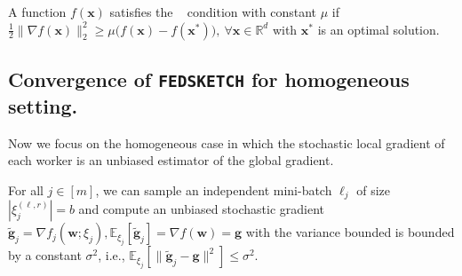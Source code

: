 \begin{assumption}[\pl]\label{assum:pl}
A function $f(\boldsymbol{x})$ satisfies the \pl~ condition with constant $\mu$ if $\frac{1}{2}\|\nabla f(\boldsymbol{x})\|_2^2\geq \mu\big(f(\boldsymbol{x})-f(\boldsymbol{x}^*)\big),\: \forall \boldsymbol{x}\in\mathbb{R}^d $ with $\boldsymbol{x}^*$ is an optimal solution.
\end{assumption}


\subsection{Convergence of  \texttt{FEDSKETCH} for homogeneous setting.} 
Now we focus on the homogeneous case in which the stochastic local gradient of each worker is an unbiased estimator of the global gradient.


\begin{assumption}\label{Assu:1.5}
For all $j\in [m]$, we can sample an independent mini-batch $\ell_j$   of size $|\xi_j^{(\ell,r)}| = b$ and compute an unbiased stochastic gradient  $\tilde{\mathbf{g}}_j = \nabla f_j(\boldsymbol{w}; \xi_j), \mathbb{E}_{\xi_j}[\tilde{\mathbf{g}}_j] = \nabla f(\boldsymbol{w})=\mathbf{g}$ with  the variance bounded is bounded by a constant $\sigma^2$, i.e., $
\mathbb{E}_{\xi_j}\left[\|\tilde{\mathbf{g}}_j-\mathbf{g}\|^2\right]\leq \sigma^2$.
\end{assumption}


